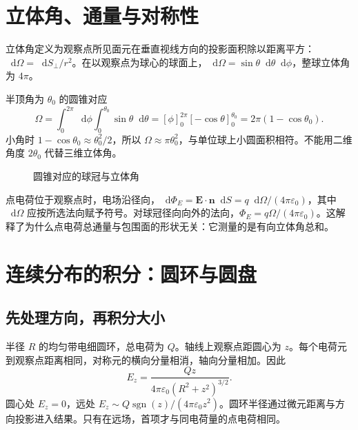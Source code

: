 \documentclass[11pt,openany,fontset=fandol]{ctexbook}
\theoremstyle{plain}\newtheorem{theorem}{定理}[chapter]\newtheorem{proposition}[theorem]{命题}
\theoremstyle{definition}\newtheorem{definition}{定义}[chapter]\newtheorem{example}{例}[chapter]
\theoremstyle{remark}\newtheorem*{remark}{说明}
\newcommand{\dd}{\mathop{}\!\mathrm d}\newcommand{\ii}{\mathrm i}\newcommand{\ee}{\mathrm e}
\newcommand{\vct}[1]{\bm{#1}}\newcommand{\Rea}{\operatorname{Re}}\newcommand{\Ima}{\operatorname{Im}}
\begin{document}
\section{立体角、通量与对称性}
立体角定义为观察点所见面元在垂直视线方向的投影面积除以距离平方：$\dd\Omega=\dd S_\perp/r^2$。在以观察点为球心的球面上，$\dd\Omega=\sin\theta\dd\theta\dd\phi$，整球立体角为 $4\pi$。

半顶角为 $\theta_0$ 的圆锥对应
\begin{equation}
\Omega=\int_0^{2\pi}\dd\phi\int_0^{\theta_0}\sin\theta\dd\theta
=[\phi]_0^{2\pi}[-\cos\theta]_0^{\theta_0}
=2\pi(1-\cos\theta_0).
\end{equation}
小角时 $1-\cos\theta_0\approx\theta_0^2/2$，所以 $\Omega\approx\pi\theta_0^2$，与单位球上小圆面积相符。不能用二维角度 $2\theta_0$ 代替三维立体角。

\begin{figure}[htbp]
\centering
{}
\caption{圆锥对应的球冠与立体角}\label{fig:solid-angle}
\end{figure}

点电荷位于观察点时，电场沿径向，$\dd\Phi_E=\vct E\cdot\vct n\dd S=q\dd\Omega/(4\pi\varepsilon_0)$，其中 $\dd\Omega$ 应按所选法向赋予符号。对球冠径向向外的法向，$\Phi_E=q\Omega/(4\pi\varepsilon_0)$。这解释了为什么点电荷总通量与包围面的形状无关：它测量的是有向立体角总和。

\section{连续分布的积分：圆环与圆盘}
\subsection{先处理方向，再积分大小}
半径 $R$ 的均匀带电细圆环，总电荷为 $Q$。轴线上观察点距圆心为 $z$。每个电荷元到观察点距离相同，对称元的横向分量相消，轴向分量相加。因此
\begin{equation}
E_z=\frac{Qz}{4\pi\varepsilon_0(R^2+z^2)^{3/2}}.
\end{equation}
圆心处 $E_z=0$，远处 $E_z\sim Q\operatorname{sgn}(z)/(4\pi\varepsilon_0z^2)$。圆环半径通过微元距离与方向投影进入结果。只有在远场，首项才与同电荷量的点电荷相同。
\end{document}
